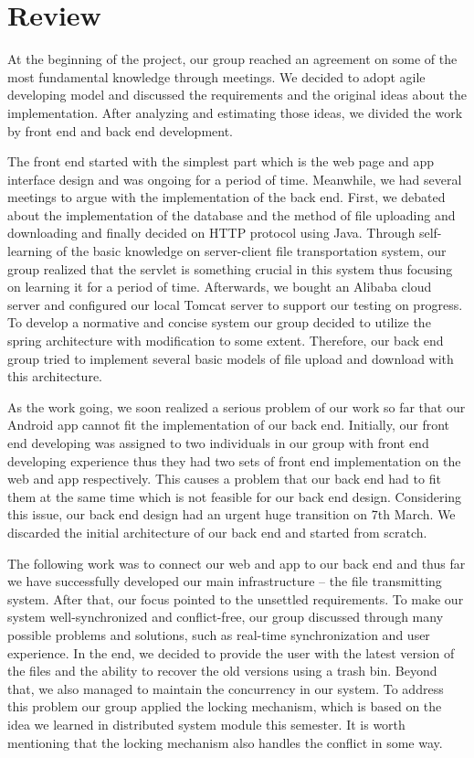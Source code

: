 \documentclass[a4paper,11pt]{article}
\begin{document}
\section{Review}
\par At the beginning of the project, our group reached an agreement on some of the most fundamental knowledge through meetings. We decided to adopt agile developing model and discussed the requirements and the original ideas about the implementation. After analyzing and estimating those ideas, we divided the work by front end and back end development.
\par The front end started with the simplest part which is the web page and app interface design and was ongoing for a period of time. Meanwhile, we had several meetings to argue with the implementation of the back end. First, we debated about the implementation of the database and the method of file uploading and downloading and finally decided on HTTP protocol using Java. Through self-learning of the basic knowledge on server-client file transportation system, our group realized that the servlet is something crucial in this system thus focusing on learning it for a period of time. Afterwards, we bought an Alibaba cloud server and configured our local Tomcat server to support our testing on progress. To develop a normative and concise system our group decided to utilize the spring architecture with modification to some extent. Therefore, our back end group tried to implement several basic models of file upload and download with this architecture.
\par As the work going, we soon realized a serious problem of our work so far that our Android app cannot fit the implementation of our back end. Initially, our front end developing was assigned to two individuals in our group with front end developing experience thus they had two sets of front end implementation on the web and app respectively. This causes a problem that our back end had to fit them at the same time which is not feasible for our back end design. Considering this issue, our back end design had an urgent huge transition on 7th March. We discarded the initial architecture of our back end and started from scratch.
\par The following work was to connect our web and app to our back end and thus far we have successfully developed our main infrastructure -- the file transmitting system. After that, our focus pointed to the unsettled requirements. To make our system well-synchronized and conflict-free, our group discussed through many possible problems and solutions, such as real-time synchronization and user experience. In the end, we decided to provide the user with the latest version of the files and the ability to recover the old versions using a trash bin. Beyond that, we also managed to maintain the concurrency in our system. To address this problem our group applied the locking mechanism, which is based on the idea we learned in distributed system module this semester. It is worth mentioning that the locking mechanism also handles the conflict in some way.
\end{document}
